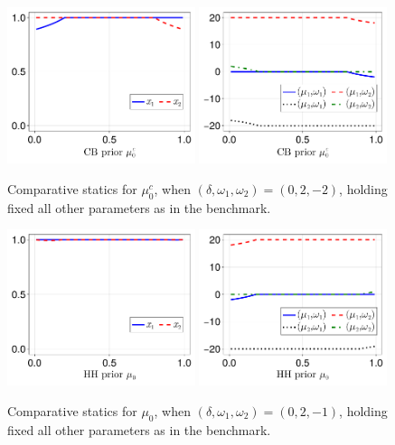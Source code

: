 \documentclass[12pt,a4paper]{article}
\begin{document}
\begin{figure}[H]
\centering
\includegraphics[width=0.49\textwidth]{figures/V8/γ_10/fig_optimal_π_across_μ_0_c_ω_1_2_ω_2_-2_δ_0.0_.pdf}
\includegraphics[width=0.49\textwidth]{figures/V8/γ_10/fig_posterior_across_μ_0_c_ω_1_2_ω_2_-2_δ_0.0_.pdf}
\caption{Comparative statics for $\mu_0^c$, when $(\delta,\omega_1,\omega_2)=(0,2,-2)$, holding fixed all other parameters as in the benchmark.}
\label{FigureA10}
\end{figure}

\begin{figure}[H]
\centering
\includegraphics[width=0.49\textwidth]{figures/V8/γ_10/fig_optimal_π_across_μ_0_ω_1_2_ω_2_-1_δ_0.0_.pdf}
\includegraphics[width=0.49\textwidth]{figures/V8/γ_10/fig_posterior_across_μ_0_ω_1_2_ω_2_-1_δ_0.0_.pdf}
\caption{Comparative statics for $\mu_0$, when $(\delta,\omega_1,\omega_2)=(0,2,-1)$, holding fixed all other parameters as in the benchmark.}
\label{FigureA11}
\end{figure}
\end{document}
